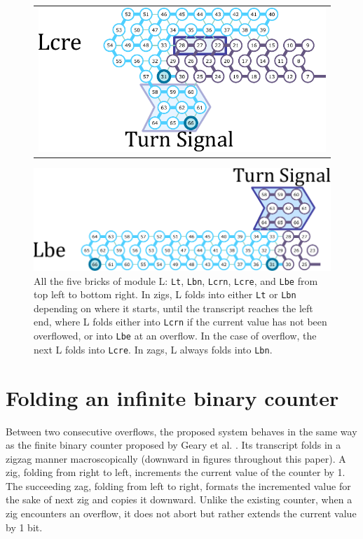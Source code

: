 \documentclass[twocolumn]{svjour3}
\begin{document}
\begin{figure}[tb]
\begin{tabular}{c}
  \begin{minipage}{0.5\linewidth}
  \centering
   \includegraphics[width=\linewidth]{fig/svg/Ltre_3.pdf}
 \end{minipage}
 \end{tabular}

  \centering
   \includegraphics[width=0.5\linewidth]{fig/svg/Lbe_3.pdf}


 
 \caption{All the five bricks of module L: \texttt{Lt}, \texttt{Lbn}, \texttt{Lcrn}, \texttt{Lcre}, and \texttt{Lbe} from top left to bottom right.
In zigs, L folds into either \texttt{Lt} or \texttt{Lbn} depending on where it starts, until the transcript reaches the left end, where L folds either into \texttt{Lcrn} if the current value has not been overflowed, or into \texttt{Lbe} at an overflow.
In the case of overflow, the next L folds into \texttt{Lcre}.
In zags, L always folds into \texttt{Lbn}.}
 \label{fig:leftturns}
\end{figure}


\section{Folding an infinite binary counter}

Between two consecutive overflows, the proposed system behaves in the same way as the finite binary counter proposed by Geary et al. \cite{GeMeScSe2019}.
Its transcript folds in a zigzag manner macroscopically (downward in figures throughout this paper).
A zig, folding from right to left, increments the current value of the counter by 1.
The succeeding zag, folding from left to right, formats the incremented value for the sake of next zig and copies it downward.
Unlike the existing counter, when a zig encounters an overflow, it does not abort but rather extends the current value by 1 bit.
\end{document}
